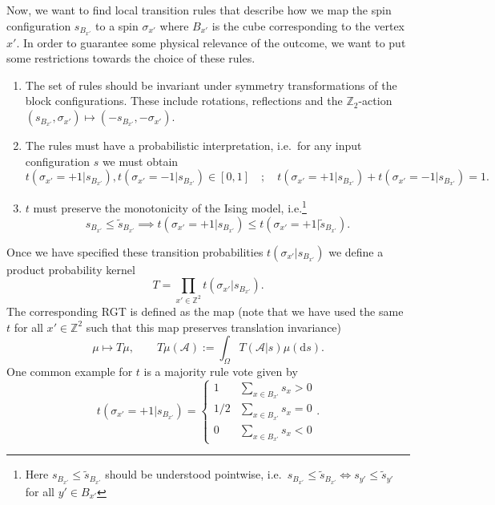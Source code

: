 \documentclass{article}
\begin{document}
Now, we want to find local transition rules that describe how we map the spin configuration $s_{B_{x'}}$ to a spin $\sigma_{x'}$ where $B_{x'}$ is the cube corresponding to the vertex $x'$. In order to guarantee some physical relevance of the outcome, we want to put some restrictions towards the choice of these rules.
\begin{enumerate}
    \item[R1:] The set of rules should be invariant under symmetry transformations of the block configurations. These include rotations, reflections and the $\mathds{Z}_2$-action $(s_{B_{x'}},\sigma_{x'})\mapsto(-s_{B_{x'}},-\sigma_{x'})$.
    \item[R2:] The rules must have a probabilistic interpretation, i.e.\ for any input configuration $s$ we must obtain
    \begin{equation}
        t(\sigma_{x'}=+1|s_{B_{x'}}),t(\sigma_{x'}=-1|s_{B_{x'}})\in[0,1]\quad;\quad t(\sigma_{x'}=+1|s_{B_{x'}})+t(\sigma_{x'}=-1|s_{B_{x'}})=1.
    \end{equation}
    \item[R3:] $t$ must preserve the monotonicity of the Ising model, i.e.\footnote{Here $s_{B_{x'}}\leq\tilde s_{B_{x'}}$ should be understood pointwise, i.e.\ $s_{B_{x'}}\leq\tilde s_{B_{x'}}\iff s_{y'}\leq\tilde s_{y'}$ for all $y'\in B_{x'}$}
    \begin{equation}
        s_{B_{x'}}\leq\tilde s_{B_{x'}}\implies t(\sigma_{x'}=+1|s_{B_{x'}})\leq t(\sigma_{x'}=+1|\tilde s_{B_{x'}}).
    \end{equation}
\end{enumerate}
Once we have specified these transition probabilities $t(\sigma_{x'}|s_{B_{x'}})$ we define a product probability kernel
\begin{equation}
    T=\prod_{x'\in\mathds{Z}^2}t(\sigma_{x'}| s_{B_{x'}}).
\end{equation}
The corresponding RGT is defined as the map (note that we have used the same $t$ for all $x'\in\mathds{Z}^2$ such that this map preserves translation invariance)
\begin{equation}
    \mu\mapsto T\mu,\qquad T\mu(\mathcal{A}):=\int_\Omega T(\mathcal{A}|s)\mu(\mathrm{d}s).
\end{equation}
One common example for $t$ is a majority rule vote given by
\begin{equation}
    t(\sigma_{x'}=+1|s_{B_{x'}})=\begin{cases}
        1&\sum_{x\in B_{x'}}s_x>0\\
        1/2&\sum_{x\in B_{x'}}s_x=0\\
        0&\sum_{x\in B_{x'}}s_x<0
    \end{cases}.
\end{equation}
\end{document}
